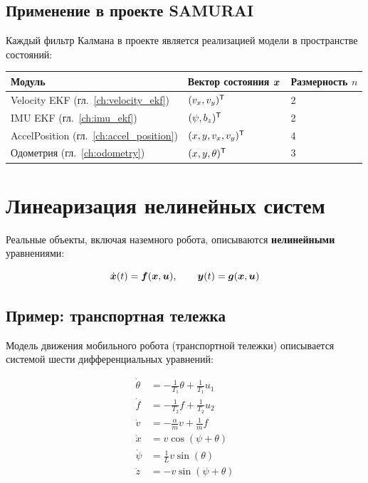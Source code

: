\subsection{Применение в проекте SAMURAI}

Каждый фильтр Калмана в проекте является реализацией модели
в пространстве состояний:

\begin{center}
\begin{tabular}{lll}
\toprule
\textbf{Модуль} & \textbf{Вектор состояния $\bm{x}$} & \textbf{Размерность $n$}\\
\midrule
Velocity EKF (гл.~\ref{ch:velocity_ekf}) & $(v_x, v_y)^{\mathsf{T}}$ & 2\\
IMU EKF (гл.~\ref{ch:imu_ekf}) & $(\psi, b_z)^{\mathsf{T}}$ & 2\\
AccelPosition (гл.~\ref{ch:accel_position}) & $(x, y, v_x, v_y)^{\mathsf{T}}$ & 4\\
Одометрия (гл.~\ref{ch:odometry}) & $(x, y, \theta)^{\mathsf{T}}$ & 3\\
\bottomrule
\end{tabular}
\end{center}

\section{Линеаризация нелинейных систем}
\label{sec:linearization}

Реальные объекты, включая наземного робота, описываются
\textbf{нелинейными} уравнениями:

\begin{equation}
  \dot{\bm{x}}(t) = \bm{f}(\bm{x}, \bm{u}), \qquad
  \bm{y}(t) = \bm{g}(\bm{x}, \bm{u})
  \label{eq:nonlinear_system}
\end{equation}

\subsection{Пример: транспортная тележка}

Модель движения мобильного робота (транспортной тележки) описывается
системой шести дифференциальных уравнений:

\begin{align}
  \dot{\theta} &= -\frac{1}{T_1}\theta + \frac{1}{T_1}u_1 \label{eq:cart_theta}\\
  \dot{f} &= -\frac{1}{T_2}f + \frac{1}{T_2}u_2 \label{eq:cart_force}\\
  \dot{v} &= -\frac{\alpha}{m}v + \frac{1}{m}f \label{eq:cart_vel}\\
  \dot{x} &= v\cos(\psi + \theta) \label{eq:cart_x}\\
  \dot{\psi} &= \frac{1}{L}v\sin(\theta) \label{eq:cart_psi}\\
  \dot{z} &= -v\sin(\psi + \theta) \label{eq:cart_z}
\end{align}


